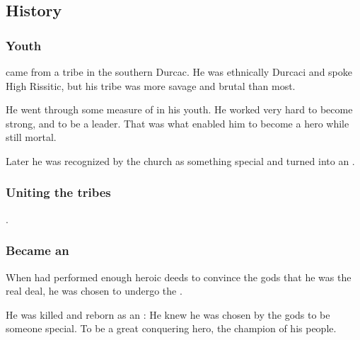 \subsection{History}





\subsubsection{Youth}
\Narkiza came from a tribe in the southern Durcac.
He was ethnically Durcaci and spoke High Rissitic, but his tribe was more savage and brutal than most. 

He went through some measure of  in his youth.
He worked very hard to become strong, and to be a leader.
That was what enabled him to become a hero while still mortal.

Later he was recognized by the church as something special and turned into an \Ashenoch.





\subsubsection{Uniting the tribes}
\Narkiza {}. 





\subsubsection{Became an \Ashenoch}
When \Narkiza had performed enough heroic deeds to convince the gods that he was the real deal, he was chosen to undergo the . 

He was killed and reborn as an \Ashenoch:
He knew he was chosen by the gods to be someone special.
To be a great conquering hero, the champion of his people.







